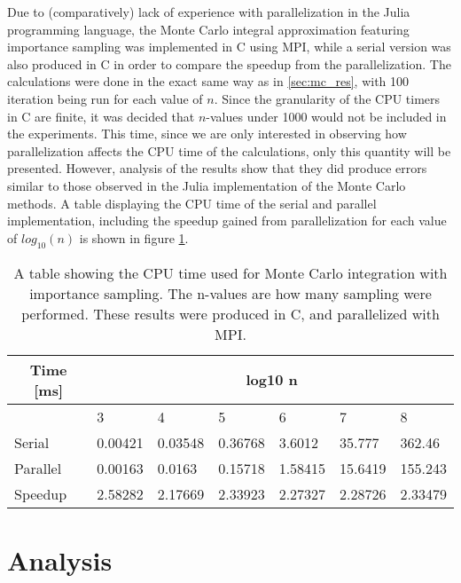 \documentclass[a4paper,10pt,english]{article}
\begin{document}
Due to (comparatively) lack of experience with parallelization in the Julia programming language, the Monte Carlo integral approximation featuring importance sampling was implemented in C using MPI, while a serial version was also produced in C in order to compare the speedup from the parallelization. The calculations were done in the exact same way as in \ref{sec:mc_res}, with 100 iteration being run for each value of $n$. Since the granularity of the CPU timers in C are finite, it was decided that $n$-values under 1000 would not be included in the experiments. This time, since we are only interested in observing how parallelization affects the CPU time of the calculations, only this quantity will be presented. However, analysis of the results show that they did produce errors similar to those observed in the Julia implementation of the Monte Carlo methods. A table displaying the CPU time of the serial and parallel implementation, including the speedup gained from parallelization for each value of $log_{10}(n)$ is shown in figure \ref{tab:mc_parallel}.

\begin{table}[] \centering
\begin{tabular}{|l|l|l|l|l|l|l|}
\hline
\multicolumn{1}{|c|}{Time {[}ms{]}} & \multicolumn{6}{c|}{log10 n}                              \\ \hline
                                    & 3       & 4       & 5       & 6       & 7       & 8       \\ \hline
Serial                              & 0.00421 & 0.03548 & 0.36768 & 3.6012  & 35.777  & 362.46  \\ \hline
Parallel                            & 0.00163 & 0.0163  & 0.15718 & 1.58415 & 15.6419 & 155.243 \\ \hline
Speedup                             & 2.58282 & 2.17669 & 2.33923 & 2.27327 & 2.28726 & 2.33479 \\ \hline
\end{tabular}
\caption{A table showing the CPU time used for Monte Carlo integration with importance sampling. The n-values are how many sampling were performed. These results were produced in C, and parallelized with MPI.}
\label{tab:mc_parallel}
\end{table}




\section{Analysis}
\end{document}
